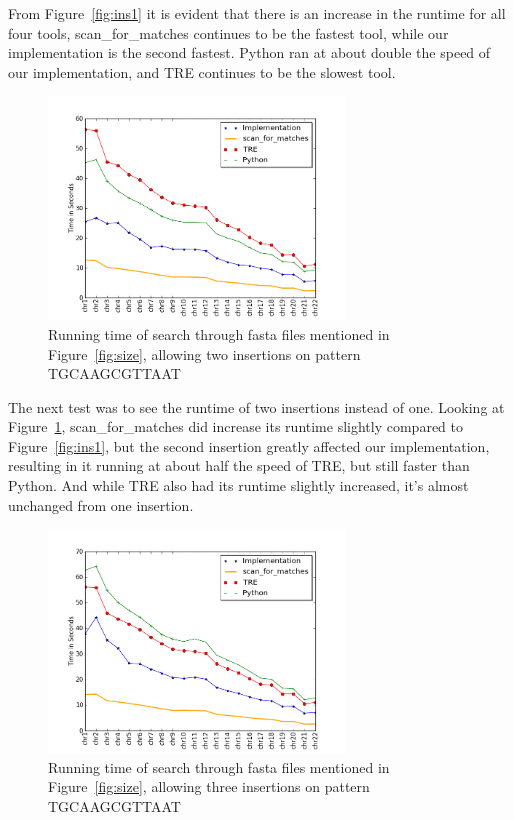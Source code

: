 From Figure~\ref{fig:ins1} it is evident that there is an increase in the runtime for all four tools, scan\_for\_matches continues to be the fastest tool, while our implementation is the second fastest. Python ran at about double the speed of our implementation, and TRE continues to be the slowest tool.

\begin{figure}[h!]
\centering
\includegraphics[width=0.7\textwidth]{Benchmarking/2ins.png}
\caption{Running time of search through fasta files mentioned in Figure~\ref{fig:size},  allowing two insertions on pattern TGCAAGCGTTAAT}
\label{fig:ins2}
\end{figure}

The next test was to see the runtime of two insertions instead of one. Looking at Figure~\ref{fig:ins2}, scan\_for\_matches did increase its runtime slightly compared to Figure~\ref{fig:ins1}, but the second insertion greatly affected our implementation, resulting in it running at about half the speed of TRE, but still faster than Python.  And while TRE also had its runtime slightly increased, it's almost unchanged from one insertion.

\begin{figure}[h!]
\centering
\includegraphics[width=0.7\textwidth]{Benchmarking/3ins.png}
\caption{Running time of search through fasta files mentioned in Figure~\ref{fig:size},  allowing three insertions on pattern TGCAAGCGTTAAT}
\label{fig:ins3}
\end{figure}

